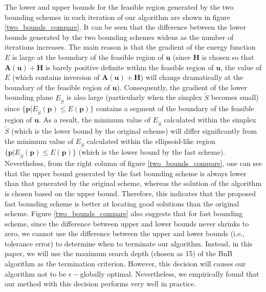\documentclass[11pt,bezier,]{article}
\begin{document}
%
The lower and upper bounds for the feasible region 
generated by the two bounding schemes in each iteration of
our algorithm are shown in
figure \ref{two_bounds_compare}.
It can be seen that the difference between the lower bounds  generated by the two bounding schemes widens
as the number of iterations increases.
The main reason is that 
the gradient of the energy function $E$ is large at the boundary of the feasible region of $\mathbf u$
(since $\mathbf H$ is chosen so that $\mathbf A(\mathbf u)+\mathbf H$ is barely positive definite
within the feasible region of $\mathbf u$,
 the value of $E$ (which contains inversion of $\mathbf A(\mathbf u)+\mathbf H$)
will  change dramatically at the boundary of the feasible region of $\mathbf u$).
Consequently,
the gradient of the lower bounding plane $E_{\widetilde S}$ is also large
(particularly when the simplex ${\widetilde S}$  becomes small)
since $\{\mathbf p|  E_{\widetilde S}(\mathbf p)\le E(\mathbf p) \}$
contains a segment of the boundary of the feasible region of $\mathbf u$.
As a result, 
the minimum value of $E_{\widetilde S}$ calculated within the simplex ${\widetilde S}$ 
(which is the lower bound by the original scheme)
will differ significantly from the minimum value of $E_{\widetilde S}$ calculated within the ellipsoid-like region
$\{\mathbf p|  E_{\widetilde S}(\mathbf p)\le E(\mathbf p) \}$
(which is the lower bound by the fast scheme).
Nevertheless,
from the right column of  figure  \ref{two_bounds_compare}, 
one can see that the upper bound generated by the fast bounding scheme is always lower than that generated by the original
scheme,
whereas the solution of the algorithm is chosen based on the upper bound.
Therefore, this indicates that the proposed fast bounding scheme is better at locating good solutions than the original scheme.
Figure  \ref{two_bounds_compare}  also suggests that for fast bounding scheme,
since the difference between upper and lower bounds never shrinks to zero,
we cannot use the difference between the upper and lower bounds (i.e., tolerance error)
to determine when to terminate our algorithm.
Instead, in this paper, 
we will use the maximum search depth (chosen as 15) of the BnB algorithm as the termination criterion.
However,
this decision will causes our algorithm not to be $\epsilon-$globally optimal.
Nevertheless,
we empirically found that our method with this decision performs very well in practice.
\end{document}
